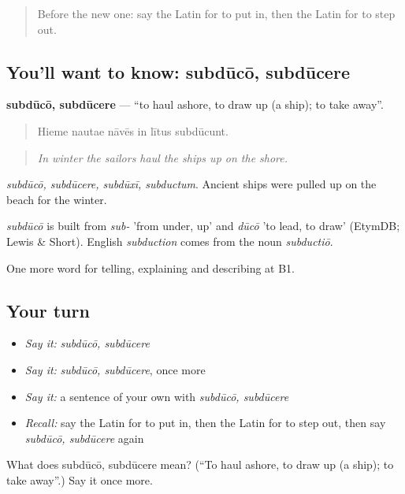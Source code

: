 \begin{quote}
Before the new one: say the Latin for to put in, then the Latin for to step out.
\end{quote}

\subsection*{You'll want to know: subdūcō, subdūcere}
\textbf{subdūcō, subdūcere} — \textquotedblleft{}to haul ashore, to draw up (a ship); to take away\textquotedblright{}.

\begin{quote}
Hieme nautae nāvēs in lītus subdūcunt.
\end{quote}

\begin{quote}
\emph{In winter the sailors haul the ships up on the shore.}
\end{quote}

\emph{subdūcō, subdūcere, subdūxī, subductum}. Ancient ships were pulled up on the beach for the winter.

\begin{cousinweb}
\emph{subdūcō} is built from \emph{sub-} 'from under, up' and \emph{dūcō} 'to lead, to draw' (EtymDB; Lewis \& Short). English \emph{subduction} comes from the noun \emph{subductiō}.
\end{cousinweb}

\begin{grammarlens}[title={What you've built}]
One more word for telling, explaining and describing at B1.
\end{grammarlens}

\subsection*{Your turn}
\begin{itemize}
\raggedright
  \item \emph{Say it:} \emph{subdūcō, subdūcere}
  \item \emph{Say it:} \emph{subdūcō, subdūcere}, once more
  \item \emph{Say it:} a sentence of your own with \emph{subdūcō, subdūcere}
  \item \emph{Recall:} say the Latin for to put in, then the Latin for to step out, then say \emph{subdūcō, subdūcere} again
\end{itemize}

\begin{tcolorbox}[breakable,colback=teal!4,colframe=teal!35!black,title={Before you move on}]
What does subdūcō, subdūcere mean? (\textquotedblleft{}To haul ashore, to draw up (a ship); to take away\textquotedblright{}.) Say it once more.
\end{tcolorbox}
